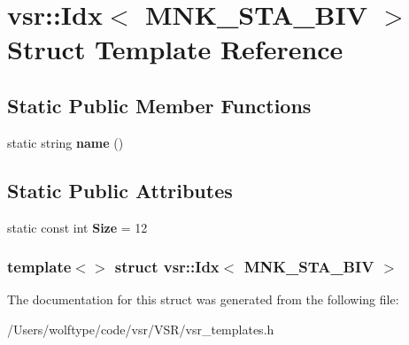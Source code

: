 \hypertarget{structvsr_1_1_idx_3_01_m_n_k___s_t_a___b_i_v_01_4}{\section{vsr\-:\-:Idx$<$ M\-N\-K\-\_\-\-S\-T\-A\-\_\-\-B\-I\-V $>$ Struct Template Reference}
\label{structvsr_1_1_idx_3_01_m_n_k___s_t_a___b_i_v_01_4}
}
\subsection*{Static Public Member Functions}
\begin{DoxyCompactItemize}
\item 
\hypertarget{structvsr_1_1_idx_3_01_m_n_k___s_t_a___b_i_v_01_4_a061b84452dbc0d9e131f88f83a6a873c}{static string {\bfseries name} ()}\label{structvsr_1_1_idx_3_01_m_n_k___s_t_a___b_i_v_01_4_a061b84452dbc0d9e131f88f83a6a873c}

\end{DoxyCompactItemize}
\subsection*{Static Public Attributes}
\begin{DoxyCompactItemize}
\item 
\hypertarget{structvsr_1_1_idx_3_01_m_n_k___s_t_a___b_i_v_01_4_a0563c2e8a60c7533f05bc6f4ae0db37b}{static const int {\bfseries Size} = 12}\label{structvsr_1_1_idx_3_01_m_n_k___s_t_a___b_i_v_01_4_a0563c2e8a60c7533f05bc6f4ae0db37b}

\end{DoxyCompactItemize}
\subsubsection*{template$<$$>$ struct vsr\-::\-Idx$<$ M\-N\-K\-\_\-\-S\-T\-A\-\_\-\-B\-I\-V $>$}



The documentation for this struct was generated from the following file\-:\begin{DoxyCompactItemize}
\item 
/\-Users/wolftype/code/vsr/\-V\-S\-R/vsr\-\_\-templates.\-h\end{DoxyCompactItemize}
